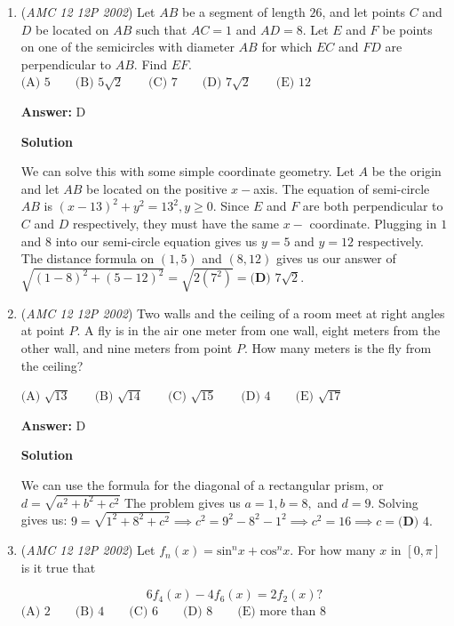\begin{enumerate}
	\item (\textit{AMC 12 12P 2002}) Let $AB$ be a segment of length $26$, and let points $C$ and $D$ be located on $AB$ such that $AC=1$ and $AD=8$. Let $E$ and $F$ be points on one of the semicircles with diameter $AB$ for which $EC$ and $FD$ are perpendicular to $AB$. Find $EF.$
$\text{(A) }5 \qquad \text{(B) }5 \sqrt{2}  \qquad \text{(C) }7 \qquad \text{(D) }7 \sqrt{2} \qquad \text{(E) }12$

 \textbf{Answer: }D



\textbf{Solution}

We can solve this with some simple coordinate geometry. Let $A$ be the origin and let $AB$ be located on the positive $x-$axis. The equation of semi-circle $AB$ is $(x-13)^2+y^2=13^2, y \geq 0.$ Since $E$ and $F$ are both perpendicular to $C$ and $D$ respectively, they must have the same $x -$ coordinate. Plugging in $1$ and $8$ into our semi-circle equation gives us $y=5$ and $y=12$ respectively. The distance formula on $(1, 5)$ and $(8, 12)$ gives us our answer of $\sqrt{(1-8)^2 + (5-12)^2}=\sqrt{2(7^2)}=\boxed{\textbf{(D) } 7\sqrt{2}}.$



	\item (\textit{AMC 12 12P 2002}) Two walls and the ceiling of a room meet at right angles at point $P.$  A fly is in the air one meter from one wall, eight meters from the other wall, and nine meters from point $P$. How many meters is the fly from the ceiling?


 $\text{(A) }\sqrt{13} \qquad \text{(B) }\sqrt{14} \qquad \text{(C) }\sqrt{15} \qquad \text{(D) }4 \qquad \text{(E) }\sqrt{17}$

 \textbf{Answer: }D



\textbf{Solution}

We can use the formula for the diagonal of a rectangular prism, or $d=\sqrt{a^2+b^2+c^2}$ The problem gives us $a=1, b=8,$ and $d=9.$ Solving gives us: $9=\sqrt{1^2 + 8^2 + c^2} \implies c^2=9^2-8^2-1^2 \implies c^2=16  \implies c=\boxed{\textbf{(D) } 4}.$



	\item (\textit{AMC 12 12P 2002}) Let $f_n (x) = \text{sin}^n x + \text{cos}^n x.$ For how many $x$ in $[0,\pi]$ is it true that


 
 \[6f_{4}(x)-4f_{6}(x)=2f_{2}(x)?\]
$\text{(A) }2 \qquad \text{(B) }4  \qquad \text{(C) }6 \qquad \text{(D) }8 \qquad \text{(E) more than }8$


\end{enumerate}
